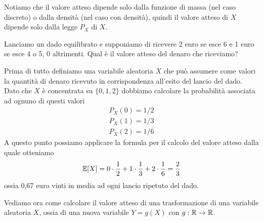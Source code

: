 Notiamo che il valore atteso dipende solo dalla funzione di massa (nel caso discreto) o dalla
densità (nel caso con densità), quindi il valore atteso di $X$ dipende solo dalla legge $P_X$
di $X$.

\begin{example}
	Lanciamo un dado equilibrato e supponiamo di ricevere 2 euro se esce 6 e 1 euro se esce 4 o 5,
	0 altrimenti. Qual è il valore atteso del denaro che riceviamo?

	Prima di tutto definiamo una variabile aleatoria $X$ che può assumere come valori la quantità
	di denaro ricevuto in corrispondenza all'esito del lancio del dado. Dato che $X$ è concentrata
	su $\{ 0, 1, 2 \}$ dobbiamo calcolare la probabilità associata ad ognuno di questi valori
	\begin{gather*}
		P_X(0) = 1 / 2 \\[1ex]
		P_X(1) = 1 / 3 \\[1ex]
		P_X(2) = 1 / 6
	\end{gather*}
	A questo punto possiamo applicare la formula per il calcolo del valore atteso dalla quale
	otteniamo
	\[ \mathbb{E}[X] = 0 \cdot \frac{1}{2} + 1 \cdot \frac{1}{3} + 2 \cdot \frac{1}{6} = \frac{2}{3} \]
	ossia 0,67 euro vinti in media ad ogni lancio ripetuto del dado.
\end{example}

Vediamo ora come calcolare il valore atteso di una trasformazione di una variabile aleatoria $X$,
ossia di una nuova variabile $Y = g(X)$ con $g : \mathbb{R} \to \mathbb{R}$.

